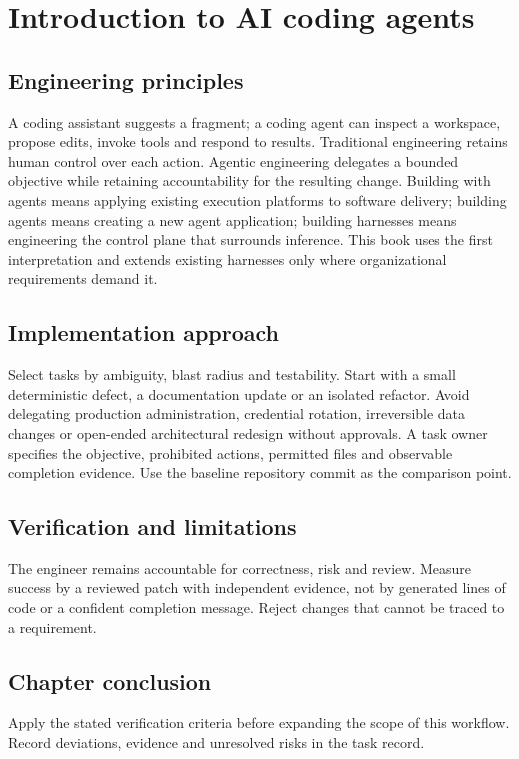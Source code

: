 \chapter{Introduction to AI coding agents}

\section{Engineering principles}

A coding assistant suggests a fragment; a coding agent can inspect a workspace, propose edits, invoke tools and respond to results. Traditional engineering retains human control over each action. Agentic engineering delegates a bounded objective while retaining accountability for the resulting change. Building with agents means applying existing execution platforms to software delivery; building agents means creating a new agent application; building harnesses means engineering the control plane that surrounds inference. This book uses the first interpretation and extends existing harnesses only where organizational requirements demand it.

\section{Implementation approach}

Select tasks by ambiguity, blast radius and testability. Start with a small deterministic defect, a documentation update or an isolated refactor. Avoid delegating production administration, credential rotation, irreversible data changes or open-ended architectural redesign without approvals. A task owner specifies the objective, prohibited actions, permitted files and observable completion evidence. Use the baseline repository commit as the comparison point.

\section{Verification and limitations}

The engineer remains accountable for correctness, risk and review. Measure success by a reviewed patch with independent evidence, not by generated lines of code or a confident completion message. Reject changes that cannot be traced to a requirement.

\section{Chapter conclusion}

Apply the stated verification criteria before expanding the scope of this workflow. Record deviations, evidence and unresolved risks in the task record.
